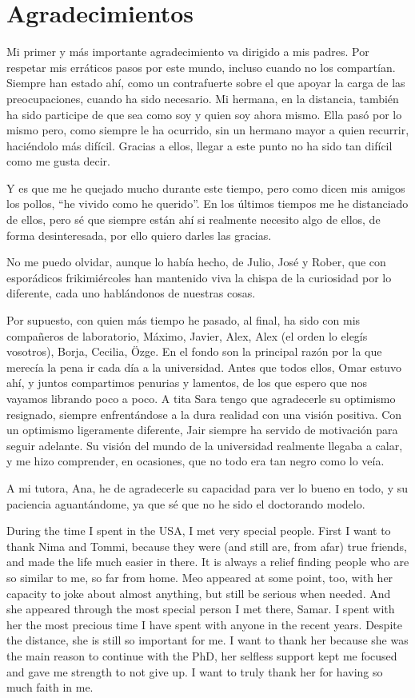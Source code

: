 \chapter*{Agradecimientos}

Mi primer y más importante agradecimiento va dirigido a mis padres. Por
respetar mis erráticos pasos por este mundo, incluso cuando no los compartían.
Siempre han estado ahí, como un contrafuerte sobre el que apoyar la carga de las
preocupaciones, cuando ha sido necesario. Mi hermana, en la distancia, también
ha sido participe de que sea como soy y quien soy ahora mismo. Ella pasó por lo
mismo pero, como siempre le ha ocurrido, sin un hermano mayor a quien recurrir,
haciéndolo más difícil. Gracias a ellos, llegar a este punto no ha sido tan
difícil como me gusta decir.

Y es que me he quejado mucho durante este tiempo, pero como dicen mis amigos los
pollos, ``he vivido como he querido''. En los últimos tiempos me he distanciado
de ellos, pero sé que siempre están ahí si realmente necesito algo de ellos, de
forma desinteresada, por ello quiero darles las gracias.

No me puedo olvidar, aunque lo había hecho, de Julio, José y Rober, que con
esporádicos frikimiércoles han mantenido viva la chispa de la curiosidad por lo
diferente, cada uno hablándonos de nuestras cosas.

Por supuesto, con quien más tiempo he pasado, al final, ha sido con mis
compañeros de laboratorio, Máximo, Javier, Alex, Alex (el orden lo elegís
vosotros), Borja, Cecilia, Özge. En el fondo son la principal razón por la que
merecía la pena ir cada día a la universidad. Antes que todos ellos, Omar estuvo
ahí, y juntos compartimos penurias y lamentos, de los que espero que nos vayamos
librando poco a poco. A tita Sara tengo que agradecerle su optimismo resignado,
siempre enfrentándose a la dura realidad con una visión positiva. Con un
optimismo ligeramente diferente, Jair siempre ha servido de motivación para
seguir adelante. Su visión del mundo de la universidad realmente llegaba a calar,
y me hizo comprender, en ocasiones, que no todo era tan negro como lo veía.

A mi tutora, Ana, he de agradecerle su capacidad para ver lo bueno en todo, y su
paciencia aguantándome, ya que sé que no he sido el doctorando modelo.

During the time I spent in the USA, I met very special people. First I want to
thank Nima and Tommi, because they were (and still are, from afar) true friends,
and made the life much easier in there. It is always a relief finding people who
are so similar to me, so far from home. Meo appeared at some point, too, with
her capacity to joke about almost anything, but still be serious when needed.
And she appeared through the most special person I met there, Samar. I spent
with her the most precious time I have spent with anyone in the recent years.
Despite the distance, she is still so important for me. I want to thank her
because she was the main reason to continue with the PhD, her selfless support
kept me focused and gave me strength to not give up. I want to truly thank her
for having so much faith in me.

